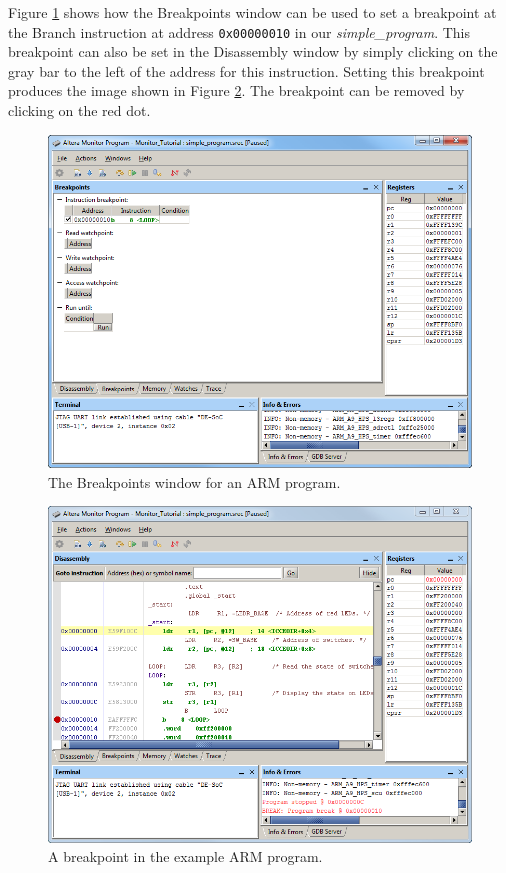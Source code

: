 \documentclass[11pt, twoside, pdftex]{article}
\begin{document}
Figure \ref{fig:AMP_breakpoints_arm} shows how the Breakpoints window can be used to set
a breakpoint at the Branch instruction at address 
\texttt{0x00000010} in our {\it simple\_program}. This breakpoint can also be set in the Disassembly window by simply
clicking on the gray bar to the left of the address for this
instruction. Setting this breakpoint produces the image shown in Figure \ref{fig:AMP_breakpointexample_arm}. The breakpoint can be removed by clicking on the red
dot.
~\\

\begin{figure}[H]
   \begin{center}
      \includegraphics[scale=0.6]{screenshots/figure30.png}
   \end{center}
   \caption{The Breakpoints window for an ARM program.} 
   \label{fig:AMP_breakpoints_arm}
\end{figure}

\begin{figure}[H]
   \begin{center}
      \includegraphics[scale=0.6]{screenshots/figure31.png}
   \end{center}
   \caption{A breakpoint in the example ARM program.} 
   \label{fig:AMP_breakpointexample_arm}
\end{figure}
\end{document}
